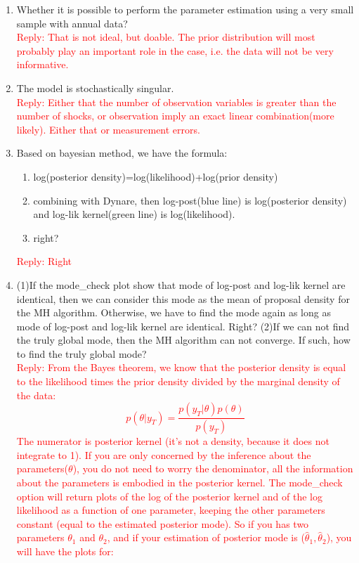 \documentclass[10pt,math=newtx,citestyle=gb7714-2015,bibstyle=gb7714-2015]{elegantbook}
\begin{document}
{{{	\begin{enumerate}
		\item Whether it is possible to perform the parameter estimation using a very small sample with annual data?\\
		\textcolor{red}{Reply: That is not ideal, but doable. The prior distribution will most probably play an important role in the case, i.e. the data will not be very informative.}
		\item The model is stochastically singular.\\
		\textcolor{red}{Reply: Either that the number of observation variables is greater than the number of shocks, or observation imply an exact linear combination(more likely). Either that or measurement errors.}
		\item Based on bayesian method, we have the formula:
		\begin{enumerate}
			\item log(posterior density)=log(likelihood)+log(prior density)
			\item combining with Dynare, then log-post(blue line) is log(posterior density) and log-lik kernel(green line) is log(likelihood).
			\item right?
		\end{enumerate}
		\textcolor{red}{Reply: Right}
		\item (1)If the mode\_check plot show that mode of log-post and log-lik kernel are identical, then we can consider this mode as the mean of proposal density for the MH algorithm. Otherwise, we have to find the mode again as long as mode of log-post and log-lik kernel are identical. Right? (2)If we can not find the truly global mode, then the MH algorithm can not converge. If  such, how to find the truly global mode?\\
		\textcolor{red}{Reply: From the Bayes theorem, we know that the posterior density is equal to the likelihood times the prior density divided by the marginal density of the data:
			$$p(\theta|y_T)=\frac{p(y_T|\theta)p(\theta)}{p(y_T)}$$
			The numerator is posterior kernel (it's not a density, because it does not integrate to 1). If you are only concerned by the inference about the parameters($\theta$), you do not need to worry the denominator, all the information about the parameters is embodied in the posterior kernel. The mode\_check option will return plots of the log of the posterior kernel and of the log likelihood as a function of one parameter, keeping the other parameters constant (equal to the estimated posterior mode). So if you has two parameters $\theta_1$ and $\theta_2$, and if your estimation of posterior mode is ($\hat{\theta}_1,\hat{\theta}_2$), you will have the plots for:
}
\end{enumerate}}}}
\end{document}
